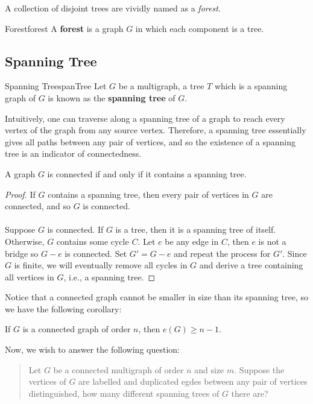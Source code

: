 \documentclass[math]{amznotes}
\theoremstyle{remark}
\begin{document}
A collection of disjoint trees are vividly named as a \textit{forest}.
\begin{dfnbox}{Forest}{forest}
    A {\color{red} \textbf{forest}} is a graph $G$ in which each component is a tree.
\end{dfnbox}

\subsection{Spanning Tree}
\begin{dfnbox}{Spanning Tree}{spanTree}
    Let $G$ be a multigraph, a tree $T$ which is a spanning graph of $G$ is known as the {\color{red} \textbf{spanning tree}} of $G$.
\end{dfnbox}
Intuitively, one can traverse along a spanning tree of a graph to reach every vertex of the graph from any source vertex. Therefore, a spanning tree essentially gives all paths between any pair of vertices, and so the existence of a spanning tree is an indicator of connectedness.
\begin{probox}{}{}
    A graph $G$ is connected if and only if it contains a spanning tree.
    \tcblower
    \begin{proof}
        If $G$ contains a spanning tree, then every pair of vertices in $G$ are connected, and so $G$ is connected.
        \\\\
        Suppose $G$ is connected. If $G$ is a tree, then it is a spanning tree of itself. Otherwise, $G$ contains some cycle $C$. Let $e$ be any edge in $C$, then $e$ is not a bridge so $G - e$ is connected. Set $G' = G - e$ and repeat the process for $G'$. Since $G$ is finite, we will eventually remove all cycles in $G$ and derive a tree containing all vertices in $G$, i.e., a spanning tree.
    \end{proof}
\end{probox}
Notice that a connected graph cannot be smaller in size than its spanning tree, so we have the following corollary:
\begin{corbox}{}{}
    If $G$ is a connected graph of order $n$, then $e(G) \geq n - 1$.
\end{corbox}
Now, we wish to answer the following question:
\begin{quote}
    Let $G$ be a connected multigraph of order $n$ and size $m$. Suppose the vertices of $G$ are labelled and duplicated egdes between any pair of vertices distinguished, how many different spanning trees of $G$ there are?
\end{quote}
\end{document}
